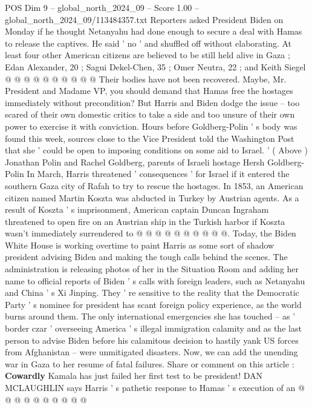 \begin{textsample}{POS Dim 9 – global\_north\_2024\_09 – Score 1.00 – global\_north\_2024\_09/113484357.txt}
Reporters asked President Biden on Monday if he thought Netanyahu had done enough to secure a deal with Hamas to release the captives.
He said ' no ' and shuffled off without elaborating.
At least four other American citizens are believed to be still held alive in Gaza ; Edan Alexander, 20 ; Sagui Dekel-Chen, 35 ; Omer Neutra, 22 ; and Keith Siegel @ @ @ @ @ @ @ @ @ @ Their bodies have not been recovered.
Maybe, Mr.
President and Madame VP, you should demand that Hamas free the hostages immediately without precondition?
But Harris and Biden dodge the issue -- too scared of their own domestic critics to take a side and too unsure of their own power to exercise it with conviction.
Hours before Goldberg-Polin ' s body was found this week, sources close to the Vice President told the Washington Post that she ' could be open to imposing conditions on some aid to Israel. ' ( Above ) Jonathan Polin and Rachel Goldberg, parents of Israeli hostage Hersh Goldberg-Polin In March, Harris threatened ' consequences ' for Israel if it entered the southern Gaza city of Rafah to try to rescue the hostages.
In 1853, an American citizen named Martin Koszta was abducted in Turkey by Austrian agents.
As a result of Koszta ' s imprisonment, American captain Duncan Ingraham threatened to open fire on an Austrian ship in the Turkish harbor if Koszta wasn't immediately surrendered to @ @ @ @ @ @ @ @ @ @.
Today, the Biden White House is working overtime to paint Harris as some sort of shadow president advising Biden and making the tough calls behind the scenes.
The administration is releasing photos of her in the Situation Room and adding her name to official reports of Biden ' s calls with foreign leaders, such as Netanyahu and China ' s Xi Jinping.
They ' re sensitive to the reality that the Democratic Party ' s nominee for president has scant foreign policy experience, as the world burns around them.
The only international emergencies she has touched -- as ' border czar ' overseeing America ' s illegal immigration calamity and as the last person to advise Biden before his calamitous decision to hastily yank US forces from Afghanistan -- were unmitigated disasters.
Now, we can add the unending war in Gaza to her resume of fatal failures.
Share or comment on this article : \textbf{Cowardly} Kamala has just failed her first test to be president!
DAN MCLAUGHLIN says Harris ' s pathetic response to Hamas ' s execution of an @ @ @ @ @ @ @ @ @ @

\end{textsample}

